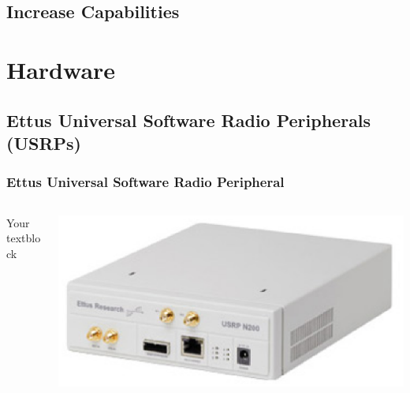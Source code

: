 \documentclass{beamer}
\begin{document}
\subsection{Increase Capabilities}

\section{Hardware}

\subsection{Ettus Universal Software Radio Peripherals (USRPs)}

\begin{frame}
\frametitle{Ettus Universal Software Radio Peripheral}
  \begin{columns}[T]
    \begin{column}{.5\textwidth}
     \begin{block}{Your textblock}
    \end{block}
    \end{column}
    \begin{column}{.5\textwidth}
    \begin{block}{}
    \includegraphics[width=\textwidth]{n200.eps}
    \end{block}
    \end{column}
  \end{columns}
\end{frame}
\end{document}
